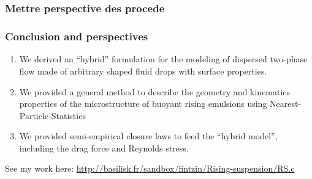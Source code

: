 \documentclass{sintefbeamer}
\begin{document}
\section*{}

\begin{frame}
  \frametitle{Mettre perspective des procede}

  

\end{frame}

\begin{frame}
  \frametitle{Conclusion and perspectives}

  \begin{enumerate}
    \item We derived an ``hybrid'' formulation for the  modeling of dispersed two-phase flow made of arbitrary shaped fluid drops with surface properties. 
    \item We provided a general method to describe the  geometry and kinematics   properties of the microstructure of buoyant rising emulsions using Nearest-Particle-Statistics
    \item We provided semi-empirical closure laws to feed the ``hybrid model'',  including the drag force and Reynolds stress. 
  \end{enumerate}
\vfill    
See my work here: \url{http://basilisk.fr/sandbox/fintzin/Rising-suspension/RS.c}

\end{frame}


 
\end{document}
